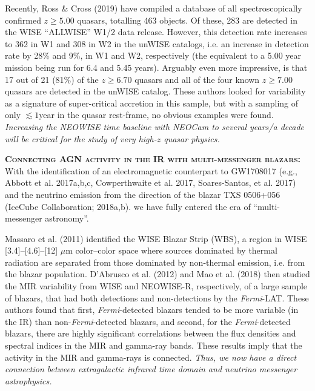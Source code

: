 \documentclass[12pt]{article}
\begin{document}
\smallskip
\smallskip
\noindent
Recently, Ross \& Cross (2019) have compiled a database of all spectroscopically confirmed $z\geq5.00$ quasars, totalling 463 objects. Of these, 283 are detected in the WISE ``ALLWISE'' W1/2 data release. However, this detection rate increases to 362 in W1 and 308 in W2 in the unWISE catalogs, i.e. an increase in detection rate by 28\% and 9\%, in W1 and W2, respectively (the equivalent to a 5.00 year mission being run for 6.4 and 5.45 years). Arguably even more impressive, is that 17  out of  21 (81\%) of the $z\geq6.70$ quasars and all of the four known $z\geq7.00$ quasars are detected in the unWISE catalog. These authors looked for variability as a signature of super-critical accretion in this sample, but with a sampling of only $\lesssim1$year in the quasar rest-frame, no obvious examples were found. 
{\it Increasing the NEOWISE time baseline with NEOCam to several years/a decade will be 
critical for the study of very high-$z$ quasar physics.} 


\smallskip
\smallskip
\noindent
\textbf{\textsc{Connecting AGN activity in the IR with multi-messenger blazars: }}
With the identification of an electromagnetic counterpart to GW1708017 (e.g., Abbott et
al. 2017a,b,c, Cowperthwaite et al. 2017, Soares-Santos, et
al. 2017)
and the neutrino emission from the direction of the blazar TXS 0506+056 
(IceCube Collaboration; 2018a,b).
we have  fully entered the era of ``multi-messenger astronomy''. 

\smallskip
\smallskip
\noindent
Massaro et al. (2011) identified the WISE Blazar Strip (WBS), a region in WISE [3.4]–[4.6]–[12] $\mu$m color–color space where sources dominated by thermal radiation are separated from those dominated by non-thermal emission, i.e. from the blazar population. D'Abrusco et al. (2012) and Mao et al. (2018) then studied the MIR variability from WISE and NEOWISE-R, respectively, of a large sample of blazars, that had both detections and non-detections by the {\it Fermi}-LAT. These authors found that first, {\it Fermi}-detected blazars tended to be more variable (in the IR) than non-{\it Fermi}-detected blazars, and second, for the {\it Fermi}-detected blazars, there are highly significant correlations between the flux densities and spectral indices in the MIR and gamma-ray bands. These results imply that the activity in the MIR and gamma-rays is connected. 
{\it Thus, we now have a direct connection between extragalactic infrared time domain and neutrino messenger astrophysics.}
\end{document}
